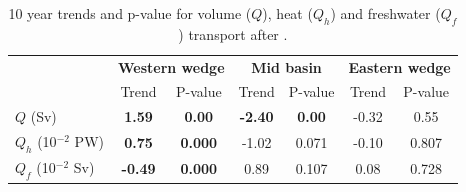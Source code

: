 \begin{table}
	\caption{10 year trends and p-value for volume ($ Q $), heat ($ Q_{h} $) and freshwater ($ Q_{f} $) transport after \citep{Hamed1998}.}
	\begin{tabular}{|l|cc|cc|cc|}
		\hline
		& \multicolumn{2}{c|}{\textbf{Western wedge}} & \multicolumn{2}{c|}{\textbf{Mid basin}} & \multicolumn{2}{c|}{\textbf{Eastern wedge}} \\
		& Trend & P-value & Trend & P-value & Trend & P-value \\
		\hline
		$Q$ (Sv) & \textbf{1.59} & \textbf{0.00} & \textbf{-2.40} & \textbf{0.00} & -0.32 & 0.55 \\
		$Q_h$ (10$^{-2}$ PW) & \textbf{0.75} & \textbf{0.000} & -1.02 & 0.071 & -0.10 & 0.807 \\
		$Q_f$ (10$^{-2}$ Sv) & \textbf{-0.49} & \textbf{0.000} & 0.89 & 0.107 & 0.08 & 0.728 \\
		\hline
	\end{tabular}
\end{table}